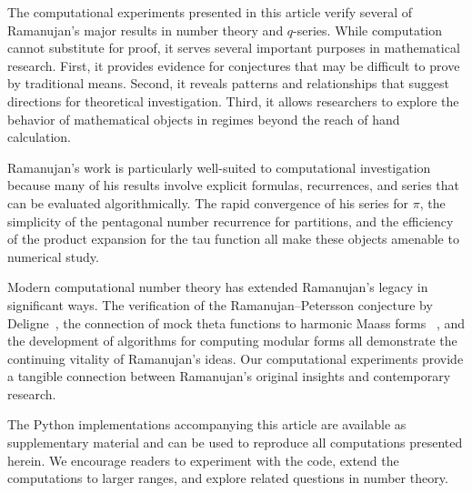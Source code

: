 \documentclass[10pt]{amsart}
\theoremstyle{plain}
\theoremstyle{definition}
\theoremstyle{remark}
\begin{document}
The computational experiments presented in this article verify several
of Ramanujan's major results in number theory and
$q$-series. While computation cannot substitute for proof, it serves
several important purposes in mathematical research. First, it provides
evidence for conjectures that may be difficult to prove by traditional
means. Second, it reveals patterns and relationships that suggest
directions for theoretical investigation. Third, it allows researchers
to explore the behavior of mathematical objects in regimes beyond the
reach of hand calculation.

Ramanujan's work is particularly well-suited to computational
investigation because many of his results involve explicit formulas,
recurrences, and series that can be evaluated algorithmically. The
rapid convergence of his series for $\pi$, the simplicity of the
pentagonal number recurrence for partitions, and the efficiency of the
product expansion for the tau function all make these objects amenable
to numerical study.

Modern computational number theory has extended
Ramanujan's legacy in significant ways. The verification
of the Ramanujan--\allowbreak Petersson conjecture by Deligne~\cite{deligne_1974},
the connection of mock theta functions to harmonic Maass forms
~\cite{bringmann_ono_2010,zagier_2010}, and the development
of algorithms for computing modular forms all demonstrate
the continuing vitality of Ramanujan's ideas.
Our computational experiments provide a tangible connection between
Ramanujan's original insights and contemporary research.

The Python implementations accompanying this article are available as
supplementary material and can be used to reproduce all computations
presented herein. We encourage readers to experiment with the code,
extend the computations to larger ranges, and explore related
questions in number theory.
\end{document}
